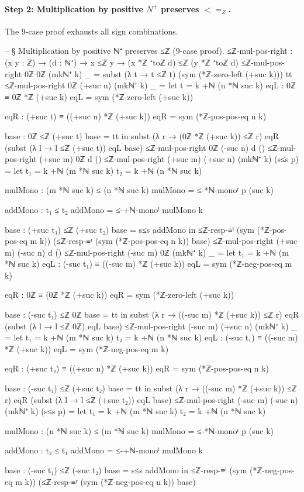 \documentclass[11pt,a4paper]{book}
\def\leq{<=}%
\def\mathbb#1{#1}%
\begin{document}
\paragraph{Step 2: Multiplication by positive $\mathbb{N}^+$ preserves $\leq_{\mathbb{Z}}$.}
The 9-case proof exhausts all sign combinations.

\begin{code}
-- § Multiplication by positive ℕ⁺ preserves ≤ℤ (9-case proof).
≤ℤ-mul-pos-right : (x y : ℤ) → (d : ℕ⁺) → x ≤ℤ y → (x *ℤ ⁺toℤ d) ≤ℤ (y *ℤ ⁺toℤ d)
≤ℤ-mul-pos-right 0ℤ 0ℤ (mkℕ⁺ k) _ =
  subst
    (λ t → t ≤ℤ t)
    (sym (*ℤ-zero-left (+suc k)))
    tt
≤ℤ-mul-pos-right 0ℤ (+suc n) (mkℕ⁺ k) _ =
  let
    t = k +ℕ (n *ℕ suc k)
    eqL : 0ℤ ≡ 0ℤ *ℤ (+suc k)
    eqL = sym (*ℤ-zero-left (+suc k))

    eqR : (+suc t) ≡ ((+suc n) *ℤ (+suc k))
    eqR = sym (*ℤ-pos-pos-eq n k)

    base : 0ℤ ≤ℤ (+suc t)
    base = tt
  in
  subst (λ r → (0ℤ *ℤ (+suc k)) ≤ℤ r) eqR
    (subst (λ l → l ≤ℤ (+suc t)) eqL base)
≤ℤ-mul-pos-right 0ℤ (-suc n) d ()
≤ℤ-mul-pos-right (+suc m) 0ℤ d ()
≤ℤ-mul-pos-right (+suc m) (+suc n) (mkℕ⁺ k) (s≤s p) =
  let
    t₁ = k +ℕ (m *ℕ suc k)
    t₂ = k +ℕ (n *ℕ suc k)

    mulMono : (m *ℕ suc k) ≤ (n *ℕ suc k)
    mulMono = ≤-*ℕ-monoʳ p (suc k)

    addMono : t₁ ≤ t₂
    addMono = ≤-+ℕ-monoˡ mulMono k

    base : (+suc t₁) ≤ℤ (+suc t₂)
    base = s≤s addMono
  in
  ≤ℤ-resp-≡ˡ (sym (*ℤ-pos-pos-eq m k))
    (≤ℤ-resp-≡ʳ (sym (*ℤ-pos-pos-eq n k)) base)
≤ℤ-mul-pos-right (+suc m) (-suc n) d ()
≤ℤ-mul-pos-right (-suc m) 0ℤ (mkℕ⁺ k) _ =
  let
    t₁ = k +ℕ (m *ℕ suc k)
    eqL : (-suc t₁) ≡ ((-suc m) *ℤ (+suc k))
    eqL = sym (*ℤ-neg-pos-eq m k)

    eqR : 0ℤ ≡ (0ℤ *ℤ (+suc k))
    eqR = sym (*ℤ-zero-left (+suc k))

    base : (-suc t₁) ≤ℤ 0ℤ
    base = tt
  in
  subst (λ r → ((-suc m) *ℤ (+suc k)) ≤ℤ r) eqR
    (subst (λ l → l ≤ℤ 0ℤ) eqL base)
≤ℤ-mul-pos-right (-suc m) (+suc n) (mkℕ⁺ k) _ =
  let
    t₁ = k +ℕ (m *ℕ suc k)
    t₂ = k +ℕ (n *ℕ suc k)
    eqL : (-suc t₁) ≡ ((-suc m) *ℤ (+suc k))
    eqL = sym (*ℤ-neg-pos-eq m k)

    eqR : (+suc t₂) ≡ ((+suc n) *ℤ (+suc k))
    eqR = sym (*ℤ-pos-pos-eq n k)

    base : (-suc t₁) ≤ℤ (+suc t₂)
    base = tt
  in
  subst (λ r → ((-suc m) *ℤ (+suc k)) ≤ℤ r) eqR
    (subst (λ l → l ≤ℤ (+suc t₂)) eqL base)
≤ℤ-mul-pos-right (-suc m) (-suc n) (mkℕ⁺ k) (s≤s p) =
  let
    t₁ = k +ℕ (m *ℕ suc k)
    t₂ = k +ℕ (n *ℕ suc k)

    mulMono : (n *ℕ suc k) ≤ (m *ℕ suc k)
    mulMono = ≤-*ℕ-monoʳ p (suc k)

    addMono : t₂ ≤ t₁
    addMono = ≤-+ℕ-monoˡ mulMono k

    base : (-suc t₁) ≤ℤ (-suc t₂)
    base = s≤s addMono
  in
  ≤ℤ-resp-≡ˡ (sym (*ℤ-neg-pos-eq m k))
    (≤ℤ-resp-≡ʳ (sym (*ℤ-neg-pos-eq n k)) base)
\end{code}
\end{document}
